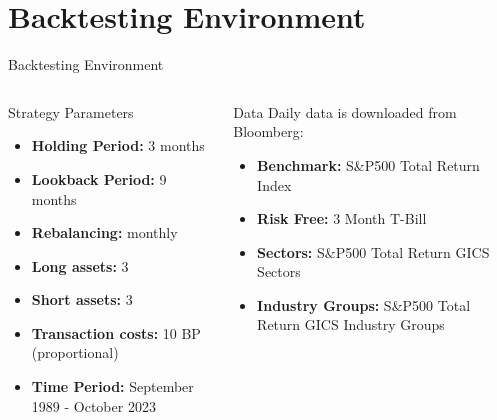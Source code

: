 \documentclass{beamer}
\begin{document}
\section{Backtesting Environment}
\begin{frame}{Backtesting Environment}
\begin{columns}[T] 

\begin{column}{0.45\textwidth} 
\begin{block}{Strategy Parameters} 
\begin{itemize}
    \item \textbf{Holding Period:} 3 months
    \item \textbf{Lookback Period:} 9 months
    \item \textbf{Rebalancing:} monthly
    \item \textbf{Long assets:} 3
    \item \textbf{Short assets:} 3
    \item \textbf{Transaction costs:} 10 BP (proportional)
    \item \textbf{Time Period:} September 1989 - October 2023
\end{itemize}
\end{block}
\end{column}

\begin{column}{0.45\textwidth} 
\begin{block}{Data} 
Daily data is downloaded from Bloomberg:
\begin{itemize}
    \item \textbf{Benchmark:} S\&P500 Total Return Index
    \item \textbf{Risk Free:} 3 Month T-Bill
    \item \textbf{Sectors:} S\&P500 Total Return GICS Sectors
    \item \textbf{Industry Groups:} S\&P500 Total Return GICS Industry Groups   
\end{itemize}
\end{block}
\end{column}

\end{columns}
\end{frame}

\end{document}
